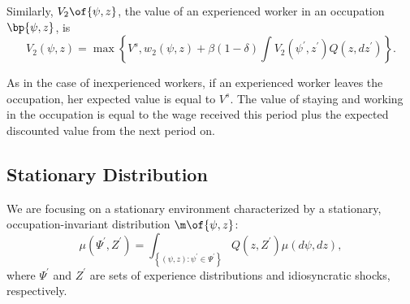 \documentclass[12pt]{article}
\theoremstyle{definition}
\begin{document}
Similarly, $V_2\of{\psi, z}$, the value of an experienced worker in an occupation $\bp{\psi, z}$, is
\begin{equation}
	\label{8}
	V_2(\psi, z)=\max \left\{V^s, w_2(\psi, z)+\beta(1-\delta) \int V_2\left(\psi^{\prime}, z^{\prime}\right) Q\left(z, d z^{\prime}\right)\right\} .
\end{equation}

As in the case of inexperienced workers, if an experienced worker leaves the occupation, her expected value is equal to $V^s$. The value of staying and working in the occupation is equal to the wage received this period plus the expected discounted value from the next period on.

\subsection{Stationary Distribution}
We are focusing on a stationary environment characterized by a stationary, occupation-invariant distribution $\m\of{\psi, z}$:
\begin{equation}
	\label{9}
	\mu\left(\Psi^{\prime}, Z^{\prime}\right)=\int_{\left\{(\psi, z): \psi^{\prime} \in \Psi^{\prime}\right\}} Q\left(z, Z^{\prime}\right) \mu(d \psi, d z),
\end{equation}
where $\Psi^{\prime}$ and $Z^{\prime}$ are sets of experience distributions and idiosyncratic shocks, respectively.
\end{document}
